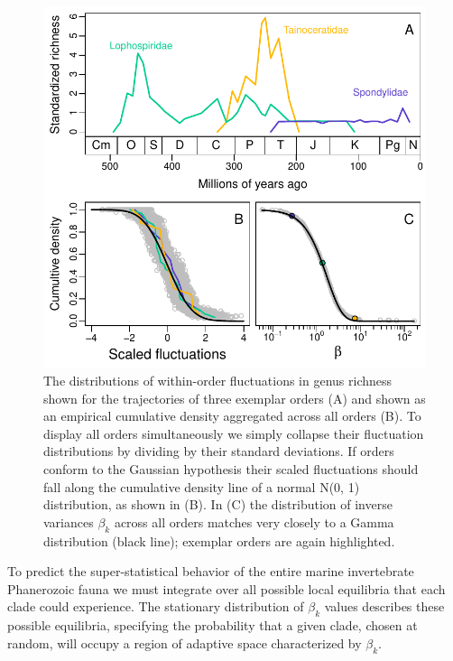 \documentclass[12pt]{article}
\begin{document}
\begin{figure}[!h]
  \centering
  \includegraphics[scale=0.8]{../../fig_pkx-fbeta.pdf}
  \caption[Variability in trajectories of within-order fluctuations in
  genus richness]{The distributions of within-order fluctuations in
    genus richness shown for the trajectories of three exemplar
    orders (A) and shown as an empirical cumulative density aggregated
    across all orders (B). To display all orders simultaneously we
    simply collapse their fluctuation distributions by dividing by
    their standard deviations. If orders conform to the Gaussian
    hypothesis their scaled fluctuations should fall along the
    cumulative density line of a normal N(0, 1) distribution, as shown
    in (B). In (C) the distribution of inverse variances $\beta_k$
    across all orders matches very closely to a Gamma distribution
    (black line); exemplar orders are again highlighted.}
  \label{fig:pk_f}
\end{figure}


To predict the super-statistical behavior of the entire marine
invertebrate Phanerozoic fauna we must integrate over all possible
local equilibria that each clade could experience. The stationary
distribution of $\beta_k$ values describes these possible equilibria,
specifying the probability that a given clade, chosen at random, will
occupy a region of adaptive space characterized by $\beta_k$.
\end{document}
